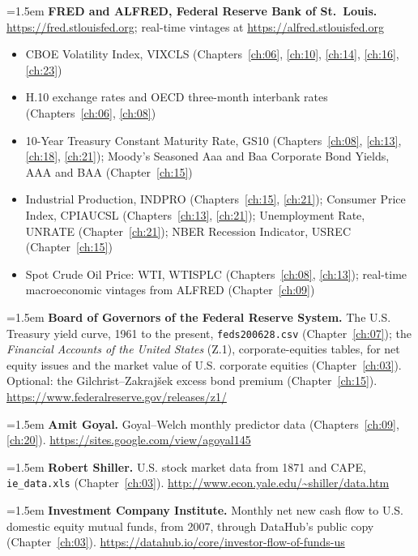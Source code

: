 \hangindent=1.5em \textbf{FRED and ALFRED, Federal Reserve Bank of St.\ Louis.} \url{https://fred.stlouisfed.org}; real-time vintages at \url{https://alfred.stlouisfed.org}
\begin{itemize}\setlength{\itemsep}{0pt}\setlength{\parskip}{0pt}
  \item CBOE Volatility Index, VIXCLS (Chapters~\ref{ch:06}, \ref{ch:10}, \ref{ch:14}, \ref{ch:16}, \ref{ch:23})
  \item H.10 exchange rates and OECD three-month interbank rates (Chapters~\ref{ch:06}, \ref{ch:08})
  \item 10-Year Treasury Constant Maturity Rate, GS10 (Chapters~\ref{ch:08}, \ref{ch:13}, \ref{ch:18}, \ref{ch:21}); Moody's Seasoned Aaa and Baa Corporate Bond Yields, AAA and BAA (Chapter~\ref{ch:15})
  \item Industrial Production, INDPRO (Chapters~\ref{ch:15}, \ref{ch:21}); Consumer Price Index, CPIAUCSL (Chapters~\ref{ch:13}, \ref{ch:21}); Unemployment Rate, UNRATE (Chapter~\ref{ch:21}); NBER Recession Indicator, USREC (Chapter~\ref{ch:15})
  \item Spot Crude Oil Price: WTI, WTISPLC (Chapters~\ref{ch:08}, \ref{ch:13}); real-time macroeconomic vintages from ALFRED (Chapter~\ref{ch:09})
\end{itemize}

\hangindent=1.5em \textbf{Board of Governors of the Federal Reserve System.} The U.S. Treasury yield curve, 1961 to the present, \texttt{feds200628.csv} (Chapter~\ref{ch:07}); the \emph{Financial Accounts of the United States} (Z.1), corporate-equities tables, for net equity issues and the market value of U.S. corporate equities (Chapter~\ref{ch:03}). Optional: the Gilchrist--Zakraj\v{s}ek excess bond premium (Chapter~\ref{ch:15}). \url{https://www.federalreserve.gov/releases/z1/}

\hangindent=1.5em \textbf{Amit Goyal.} Goyal--Welch monthly predictor data (Chapters~\ref{ch:09}, \ref{ch:20}). \url{https://sites.google.com/view/agoyal145}

\hangindent=1.5em \textbf{Robert Shiller.} U.S. stock market data from 1871 and CAPE, \texttt{ie\_data.xls} (Chapter~\ref{ch:03}). \url{http://www.econ.yale.edu/~shiller/data.htm}

\hangindent=1.5em \textbf{Investment Company Institute.} Monthly net new cash flow to U.S. domestic equity mutual funds, from 2007, through DataHub's public copy (Chapter~\ref{ch:03}). \url{https://datahub.io/core/investor-flow-of-funds-us}

